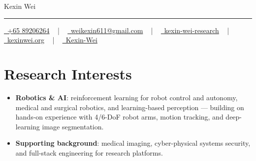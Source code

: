 \documentclass[a4paper,10pt]{article}
\newenvironment{zitemize}{
\vspace{0.1cm}
\begin{itemize}\itemsep 1.5pt \parskip 2pt \parsep 5pt}
{\end{itemize}\vspace{-0.3cm}}
\begin{document}
\begin{center}
  \begin{center}
    {\Huge\color{UI_blue} Kexin Wei}
    \vspace{12pt}
    {\color{UI_blue} \hrule}
    \vspace{2pt}
    \vspace{2pt}
    \href{tel:+6589206264}{
      \raisebox{-0.05\height} \faPhone\ +65 89206264} ~ | ~
    \href{mailto:weikexin611@gmail.com}{
      \raisebox{-0.15\height} \faEnvelope\ weikexin611@gmail.com} ~ | ~
    \href{https://www.linkedin.com/in/kexin-wei-research/}{
      \raisebox{-0.15\height} \faLinkedin\ kexin-wei-research} ~ | ~
    \href{https://kexinwei.org/}{
      \raisebox{-0.15\height} \faGlobe\ kexinwei.org} ~ | ~
    \href{https://github.com/Kexin-Wei}{
      \raisebox{-0.15\height} \faGithub\ Kexin-Wei}
  \end{center}

\vspace{-0.15cm} 
\end{center}

\section{Research Interests}
\begin{zitemize}
    \item \textbf{Robotics \& AI}: reinforcement learning for robot control and autonomy, medical and surgical robotics, and learning-based perception --- building on hands-on experience with 4/6-DoF robot arms, motion tracking, and deep-learning image segmentation.
    \item \textbf{Supporting background}: medical imaging, cyber-physical systems security, and full-stack engineering for research platforms.
\end{zitemize}

\end{document}
